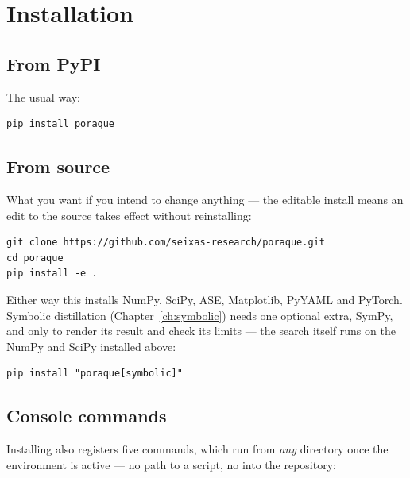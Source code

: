 \chapter{Installation}
\label{ch:install}

\section{From PyPI}

The usual way:

\begin{lstlisting}
pip install poraque
\end{lstlisting}

\section{From source}

What you want if you intend to change anything --- the editable install means
an edit to the source takes effect without reinstalling:

\begin{lstlisting}
git clone https://github.com/seixas-research/poraque.git
cd poraque
pip install -e .
\end{lstlisting}

Either way this installs NumPy, SciPy, ASE, Matplotlib, PyYAML and PyTorch.
Symbolic distillation (Chapter~\ref{ch:symbolic}) needs one optional extra,
SymPy, and only to render its result and check its limits --- the search itself
runs on the NumPy and SciPy installed above:

\begin{lstlisting}
pip install "poraque[symbolic]"
\end{lstlisting}

\section{Console commands}
\label{sec:console-scripts}

Installing also registers five commands, which run from \emph{any} directory
once the environment is active --- no path to a script, no  into the
repository:


